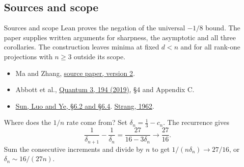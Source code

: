 \documentclass{beamer}
\begin{document}
\subsection{Sources and scope}
\begin{frame}{Sources and scope}
Lean proves the negation of the universal $-1/8$ bound. The paper supplies written arguments for sharpness, the asymptotic and all three corollaries. The construction leaves minima at fixed $d<n$ and for all rank-one projections with $n\ge3$ outside its scope.
\smallskip
\begin{itemize}
\item Ma and Zhang, \href{https://doi.org/10.5281/zenodo.24212412}{source paper, version 2}.
\item Abbott et al., \href{https://doi.org/10.22331/q-2019-10-14-194}{Quantum 3, 194 (2019)}, §4 and Appendix C.
\item \href{https://arxiv.org/abs/1503.06387v3}{Sun, Luo and Ye, §6.2 and §6.4}. \href{https://doi.org/10.2307/2312733}{Strang, 1962}.
\end{itemize}
\end{frame}

\appendix
\begin{frame}{Where does the $1/n$ rate come from?}
Set $\delta_n=\tfrac13-c_n$. The recurrence gives
\[
 \frac1{\delta_{n+1}}-\frac1{\delta_n}
 =\frac{27}{16-3\delta_n}\longrightarrow\frac{27}{16}.
\]
Sum the consecutive increments and divide by $n$ to get $1/(n\delta_n)\to27/16$, or $\delta_n\sim16/(27n)$.
\end{frame}

\FormalVerification
\end{document}
